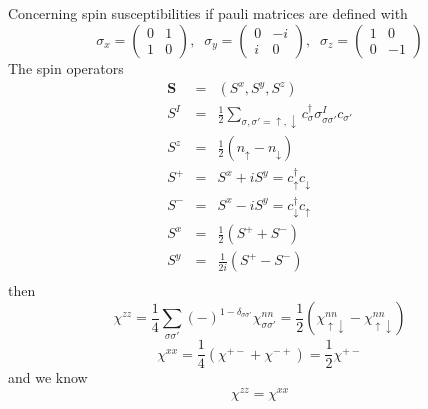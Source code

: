 \documentclass[a4paper,10pt]{article}
\newcommand{\up}{\uparrow}
\newcommand{\dn}{\downarrow}
\begin{document}
Concerning spin susceptibilities if pauli matrices are defined with 
\begin{equation}
 \sigma_x =
    \begin{pmatrix}
      0&1\\
      1&0
    \end{pmatrix}, \;\;
  \sigma_y =
    \begin{pmatrix}
      0&-i\\
      i&0
    \end{pmatrix}, \;\;
  \sigma_z =
    \begin{pmatrix}
      1&0\\
      0&-1
    \end{pmatrix} 
\end{equation}
The spin operators
\begin{eqnarray} 
 \mathbf{S} &=& (S^x,S^y,S^z) \\ \nonumber
 S^I &=& \frac{1}{2}\sum_{\sigma,\sigma'=\uparrow,\downarrow} c^\dagger_\sigma \sigma^I_{\sigma\sigma'} c_{\sigma'} \\ \nonumber
 S^z &=& \frac{1}{2}(n_\uparrow - n_\downarrow)\\ \nonumber
 S^+ &=& S^x + iS^y = c^\dagger_\uparrow c_\downarrow\\ \nonumber
 S^- &=& S^x - iS^y = c^\dagger_\downarrow c_\uparrow \\ \nonumber 
 S^x &=& \frac{1}{2}(S^+ + S^-) \\ \nonumber
 S^y &=& \frac{1}{2i}(S^+ - S^-) \\ \nonumber
\end{eqnarray}
then
\begin{equation}
 \chi^{zz} = \frac{1}{4}\sum_{\sigma\sigma'}(-)^{1-\delta_{\sigma\sigma'}} \chi^{nn}_{\sigma\sigma'} = \frac{1}{2} (\chi^{nn}_{\up\dn} - \chi^{nn}_{\up\dn})
\end{equation}
\begin{equation}
 \chi^{xx} = \frac{1}{4}(\chi^{+-} + \chi^{-+}) = \frac{1}{2}\chi^{+-}
\end{equation}
and we know
\begin{equation}
 \chi^{zz} = \chi^{xx} 
\end{equation}
\end{document}
